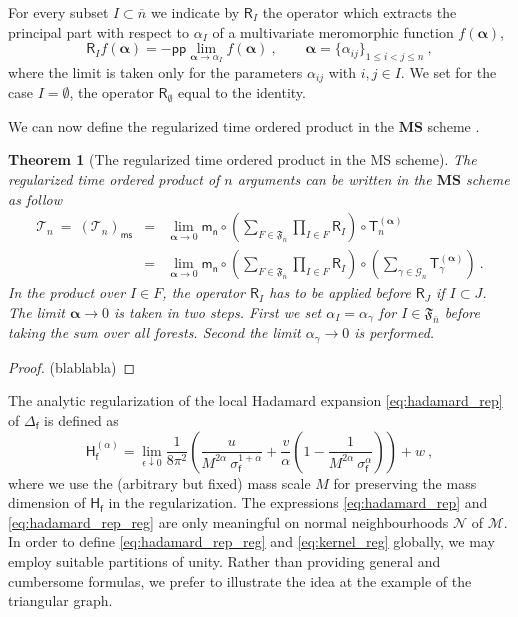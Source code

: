 \documentclass[12pt]{book}
\newcommand{\pp}{\mathsf{pp}}
\newcommand{\ms}{\mathsf{ms}}
\newcommand{\MS}{\textbf{MS}}
\newcommand{\Gcal}{\mathcal{G}}
\newcommand{\Mcal}{\mathcal{M}}
\newcommand{\Ncal}{\mathcal{N}}
\newcommand{\Tcal}{\mathcal{T}}
\newcommand{\Frak}{\mathfrak{F}}
\newcommand{\Hsf}{\mathsf{H}}
\newcommand{\Rsf}{\mathsf{R}}
\newcommand{\Tsf}{\mathsf{T}}
\newcommand{\fsf}{\mathsf{f}}
\newcommand{\msf}{\mathsf{m}}
\newcommand{\nsf}{\mathsf{n}}
\theoremstyle{break}
\newtheorem{theorem}{Theorem}
\begin{document}
For every subset $I\subset \overline{n}$ we indicate by $\Rsf_I$ the operator which extracts the principal part with respect to $\alpha_I$ of a multivariate meromorphic function $f(\boldsymbol{\alpha})$, 
%
\begin{equation}
\Rsf_I f(\boldsymbol{\alpha}) = - \pp  \lim_{\boldsymbol{\alpha} \to \alpha_I} f(\boldsymbol{\alpha}) \ ,
\qquad \boldsymbol{\alpha} = \{\alpha_{ij}\}_{1\leq i<j \leq n} \ , 
\label{eq:pp_op}
\end{equation}
%
where the limit is taken only for the parameters $\alpha_{ij}$ with $i,j \in I$. We set for the case $I=\emptyset$, the operator $\Rsf_\emptyset$ equal to the identity.


We can now define the regularized time ordered product in the $\MS$ scheme \cite{duetsch_dimensional_2014}.


\begin{theorem}[The regularized time ordered product in the MS scheme] \label{theo:renorm_t_prod_ms_forest}
The regularized time ordered product of $n$ arguments can be written in the $\MS$ scheme as follow
%
\begin{eqnarray}
\Tcal_n \ = \ \left(\Tcal_n\right)_\ms &=& \lim_{\boldsymbol{\alpha} \to 0} \msf_\nsf \circ \left( \sum_{F\in\Frak_{\overline{n}}} \prod_{I\in F} \Rsf_I \right) \circ \Tsf^{(\boldsymbol{\alpha})}_n \nonumber \\
&=& \lim_{\boldsymbol{\alpha} \to 0} \msf_\nsf \circ \left( \sum_{F\in\Frak_{\overline{n}}} \prod_{I\in F} \Rsf_I \right) \circ \left( \sum_{\gamma\in\Gcal_n} \Tsf_{\gamma}^{(\boldsymbol{\alpha})} \right) \ .
\label{eq:ms_t_forest}
\end{eqnarray}
%
In the product over $I\in F$, the operator $\Rsf_I$ has to be applied before $\Rsf_J$ if $I\subset J$.
%
The limit $\boldsymbol{\alpha} \to 0$ is taken in two steps. First we set $\alpha_{I}= \alpha_\gamma$ for $I \in \Frak_{\bar{n}}$ before taking the sum over all forests. Second the limit $\alpha_\gamma \to 0$ is performed.
\end{theorem}


\begin{proof}
(blablabla)
\end{proof}


The analytic regularization of the local Hadamard expansion \ref{eq:hadamard_rep} of $\Delta_\fsf$ is defined as 
%
\begin{equation}
\Hsf^{(\alpha)}_\fsf = \lim_{\epsilon \downarrow 0} \frac{1}{8\pi^2} \left( \frac{u}{M^{2\alpha} \ \sigma_\fsf^{1+\alpha}} + \frac{v}{\alpha} \left( 1 - \frac{1}{ M^{2\alpha} \ \sigma_\fsf^{\alpha} } \right) \right) + w \ ,
\label{eq:hadamard_rep_reg}
\end{equation}
%
where we use the (arbitrary but fixed) mass scale $M$ for preserving the mass dimension of $\Hsf_\fsf$ in the regularization. The expressions \ref{eq:hadamard_rep} and \ref{eq:hadamard_rep_reg} are only meaningful on normal neighbourhoods $\Ncal$ of $\Mcal$. In order to define \ref{eq:hadamard_rep_reg} and \ref{eq:kernel_reg} globally, we may employ suitable partitions of unity. Rather than providing general and cumbersome formulas, we prefer to illustrate the idea at the example of the triangular graph.
\end{document}
